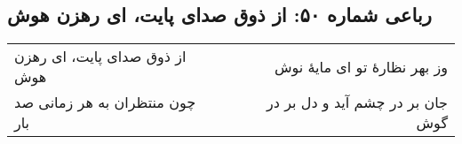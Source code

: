 \begin{center}
\section*{رباعی شماره ۵۰: از ذوق صدای پایت، ای رهزن هوش}
\label{sec:050}
\begin{longtable}{l p{0.5cm} r}
از ذوق صدای پایت، ای رهزن هوش
&&
وز بهر نظارهٔ تو ای مایهٔ نوش
\\
چون منتظران به هر زمانی صد بار
&&
جان بر در چشم آید و دل بر در گوش
\\
\end{longtable}
\end{center}
